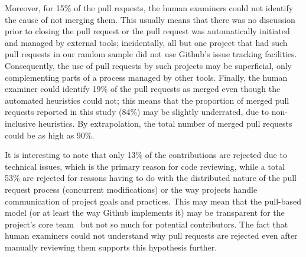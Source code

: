 \documentclass{sig-alternate}
\begin{document}
Moreover, for 15\% of the pull requests, the human examiners could not identify
the cause of not merging them. This usually means that there was no discussion
prior to closing the pull request or the pull request was automatically
initiated and managed by external tools; incidentally, all but one project that
had such pull requests in our random sample did not use Github's issue tracking
facilities. Consequently, the use of pull requests by such projects may be
superficial, only complementing parts of a process managed by other tools.
Finally, the human examiner could identify 19\% of the pull requests as merged
even though the automated heuristics could not; this means that the proportion
of merged pull requests reported in this study (84\%) may be slightly
underrated, due to non-inclusive heuristics. By extrapolation, the total number
of merged pull requests could be as high as 90\%.

It is interesting to note that only 13\% of the contributions are rejected due
to technical issues, which is the primary reason for code reviewing, while a
total 53\% are rejected for reasons having to do with the distributed nature of
the pull request process (concurrent modifications) or the way projects handle
communication of project goals and practices. This may mean that the pull-based
model (or at least the way Github implements it) may be transparent for the
project's core team~\cite{Dabbi13} but not so much for potential contributors. The fact that
human examiners could not understand why pull requests are rejected even after
manually reviewing them supports this hypothesis further.

\noindent
{}
\end{document}
